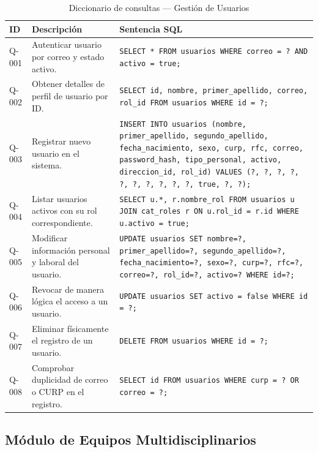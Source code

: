 \begin{table}[H]
	\centering
	\caption{Diccionario de consultas --- Gestión de Usuarios}
	\label{tab:consultas-usuarios}
	\footnotesize
	\begin{tabular}{l p{4.5cm} p{8.5cm}}
		\toprule
		\textbf{ID} & \textbf{Descripción} & \textbf{Sentencia SQL} \\
		\midrule
		Q-001 & Autenticar usuario por correo y estado activo. & 
		\texttt{SELECT * FROM usuarios WHERE correo = ? AND activo = true;} \\
		\addlinespace
		Q-002 & Obtener detalles de perfil de usuario por ID. & 
		\texttt{SELECT id, nombre, primer\_apellido, correo, rol\_id FROM usuarios WHERE id = ?;} \\
		\addlinespace
		Q-003 & Registrar nuevo usuario en el sistema. & 
		\texttt{INSERT INTO usuarios (nombre, primer\_apellido, segundo\_apellido, fecha\_nacimiento, sexo, curp, rfc, correo, password\_hash, tipo\_personal, activo, direccion\_id, rol\_id) VALUES (?, ?, ?, ?, ?, ?, ?, ?, ?, ?, true, ?, ?);} \\
		\addlinespace
		Q-004 & Listar usuarios activos con su rol correspondiente. & 
		\texttt{SELECT u.*, r.nombre\_rol FROM usuarios u JOIN cat\_roles r ON u.rol\_id = r.id WHERE u.activo = true;} \\
		\addlinespace
		Q-005 & Modificar información personal y laboral del usuario. & 
		\texttt{UPDATE usuarios SET nombre=?, primer\_apellido=?, segundo\_apellido=?, fecha\_nacimiento=?, sexo=?, curp=?, rfc=?, correo=?, rol\_id=?, activo=? WHERE id=?;} \\
		\addlinespace
		Q-006 & Revocar de manera lógica el acceso a un usuario. & 
		\texttt{UPDATE usuarios SET activo = false WHERE id = ?;} \\
		\addlinespace
		Q-007 & Eliminar físicamente el registro de un usuario. & 
		\texttt{DELETE FROM usuarios WHERE id = ?;} \\
		\addlinespace
		Q-008 & Comprobar duplicidad de correo o CURP en el registro. & 
		\texttt{SELECT id FROM usuarios WHERE curp = ? OR correo = ?;} \\
		\bottomrule
	\end{tabular}
\end{table}

\subsection{Módulo de Equipos Multidisciplinarios}

